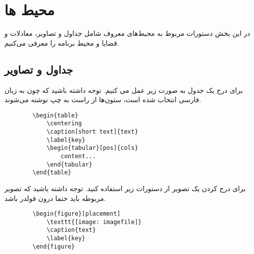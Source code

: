 \chapter{محیط ها}
در این بخش دستورات مربوط به محیط‌های معروف شامل جداول و تصاویر، معادلات و قضایا و محیط برنامه را معرفی می‌کنیم.  

\section{جداول و تصاویر} 
برای درج یک جدول به صورت زیر عمل می کنیم. توجه داشته باشید که چون به زبان فارسی انتخاب شده است، ستون‌ها از راست به چپ نوشته می‌شوند.
\begin{latin} 
	\begin{verbatim}
		\begin{table}
			\centering
			\caption[short text]{text}
			\label{key}
			\begin{tabular}[pos]{cols}
				content...
			\end{tabular}
		\end{table}
	\end{verbatim}
\end{latin}

برای درج کردن یک تصویر از دستورات زیر استفاده کنید. توجه داشته باشید که تصویر مربوطه باید حتما درون فولدر 
باشد. 
\begin{latin} 
	\begin{verbatim}
		\begin{figure}[placement]
			\texttt{[image: imagefile]}
			\caption{text}
			\label{key}
		\end{figure}
    \end{verbatim}
\end{latin}

